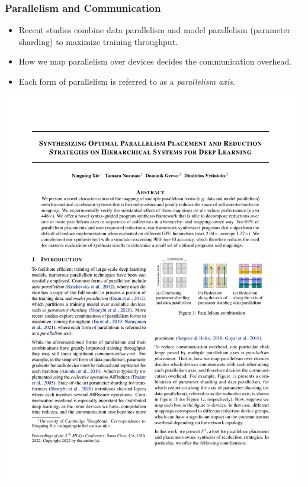 \documentclass[12pt,aspectratio=169]{beamer}
\begin{document}
    \begin{frame}
        \frametitle{Parallelism and Communication}

        \begin{itemize}
            \setlength{\itemsep}{.6em}
            \item Recent studies combine data parallelism and model parallelism (parameter sharding) to maximize training throughput.
            \item How we map parallelism over devices decides the communication overhead.
            \item Each form of parallelism is referred to as a \textit{parallelism axis}.
        \end{itemize}

        \centering
        \includegraphics[page=1,trim=10.5cm 12.5cm 2.2cm 11.2cm,clip,scale=0.85]{p2.pdf}
    \end{frame}
\end{document}
